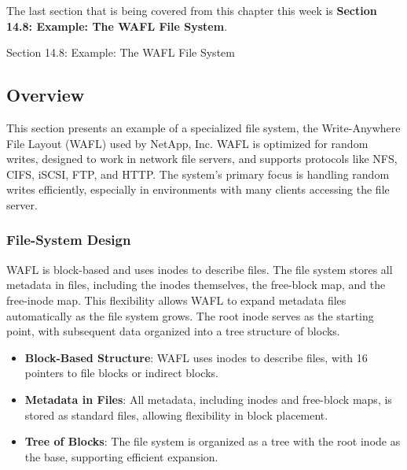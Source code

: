 The last section that is being covered from this chapter this week is \textbf{Section 14.8: Example: The WAFL File System}.

\begin{notes}{Section 14.8: Example: The WAFL File System}
    \subsection*{Overview}

    This section presents an example of a specialized file system, the Write-Anywhere File Layout (WAFL) used by NetApp, Inc. WAFL is optimized for random writes, designed to work in network file servers, 
    and supports protocols like NFS, CIFS, iSCSI, FTP, and HTTP. The system's primary focus is handling random writes efficiently, especially in environments with many clients accessing the file server.
    
    \subsubsection*{File-System Design}
    
    WAFL is block-based and uses inodes to describe files. The file system stores all metadata in files, including the inodes themselves, the free-block map, and the free-inode map. This flexibility 
    allows WAFL to expand metadata files automatically as the file system grows. The root inode serves as the starting point, with subsequent data organized into a tree structure of blocks.
    
    \begin{highlight}
    
        \begin{itemize}
            \item \textbf{Block-Based Structure}: WAFL uses inodes to describe files, with 16 pointers to file blocks or indirect blocks.
            \item \textbf{Metadata in Files}: All metadata, including inodes and free-block maps, is stored as standard files, allowing flexibility in block placement.
            \item \textbf{Tree of Blocks}: The file system is organized as a tree with the root inode as the base, supporting efficient expansion.
        \end{itemize}
    
    \end{highlight}
    

\end{notes}
